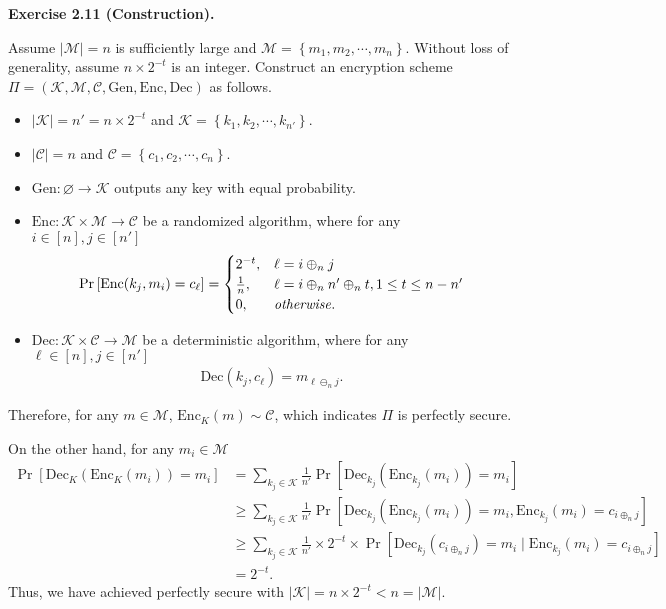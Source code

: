 \documentclass[a4paper]{article}
\newenvironment{exercise}[1]{
	\par
	\noindent\textbf{Exercise #1.}\quad
}{
	\par
	\bigskip
}
\newcommand{\cbra}[1]{\left\{ #1 \right\}}
\newcommand{\sbra}[1]{\left[ #1 \right]}
\begin{document}
\begin{exercise}{2.11 (Construction)}
        Assume $|\mathcal M|=n$ is sufficiently large and $\mathcal M=\cbra{m_1,m_2,\cdots,m_n}$.  Without loss of generality, assume $n\times 2^{-t}$ is an integer.  Construct an encryption scheme $\Pi=(\mathcal K,\mathcal M,\mathcal C,\mathrm{Gen},\mathrm{Enc},\mathrm{Dec})$ as follows.
        \begin{itemize}
            \item $|\mathcal K|=n'=n\times 2^{-t}$ and $\mathcal K=\cbra{k_1,k_2,\cdots,k_{n'}}$.
            \item $|\mathcal C|=n$ and $\mathcal C=\cbra{c_1,c_2,\cdots,c_n}$.
            \item $\mathrm{Gen}:\varnothing\to\mathcal K$ outputs any key with equal probability.
            \item $\mathrm{Enc}:\mathcal K\times\mathcal M\to\mathcal C$ be a randomized algorithm, where
                for any $i\in[n],j\in[n']$
                \begin{align*}
                    \Pr\sbra{\mathrm{Enc}(k_j,m_i)=c_\ell}=\begin{cases}
                        2^{-t}, & \ell=i\oplus_{n} j\\
                        \frac 1 n, & \ell=i\oplus_{n} n'\oplus_{n}t,1\leq t\leq n-n'\\
                        0, & \it otherwise.
                    \end{cases}
                \end{align*}
            \item $\mathrm{Dec}:\mathcal K\times\mathcal C\to\mathcal M$ be a deterministic algorithm, where
                for any $\ell\in[n],j\in[n']$
                \begin{align*}
                    \mathrm{Dec}(k_j,c_\ell)=m_{\ell\ominus_{n} j}.
                \end{align*}
        \end{itemize}
        Therefore, for any $m\in\mathcal M$, $\mathrm{Enc}_K(m)\sim \mathcal C$, 
        which indicates $\Pi$ is perfectly secure.

        On the other hand, for any $m_i\in\mathcal M$
        \begin{align*}
            \Pr\sbra{\mathrm{Dec}_K(\mathrm{Enc}_K(m_i))=m_i}
            &=\sum_{k_j\in\mathcal K}\frac{1}{n'}\Pr\sbra{\mathrm{Dec}_{k_j}(\mathrm{Enc}_{k_j}(m_i))=m_i}\\
            &\geq\sum_{k_j\in\mathcal K}\frac{1}{n'}
            \Pr\sbra{\mathrm{Dec}_{k_j}(\mathrm{Enc}_{k_j}(m_i))=m_i,\mathrm{Enc}_{k_j}(m_i)=c_{i\oplus_{n}j}}\\
            &\geq\sum_{k_j\in\mathcal K}\frac{1}{n'}\times 2^{-t}\times
            \Pr\sbra{\mathrm{Dec}_{k_j}(c_{i\oplus_{n}j})=m_i\mid\mathrm{Enc}_{k_j}(m_i)=c_{i\oplus_{n}j}}\\
            &=2^{-t}.
        \end{align*}
        Thus, we have achieved perfectly secure with $|\mathcal K|=n\times 2^{-t}<n=|\mathcal M|$.
\end{exercise}
\end{document}
